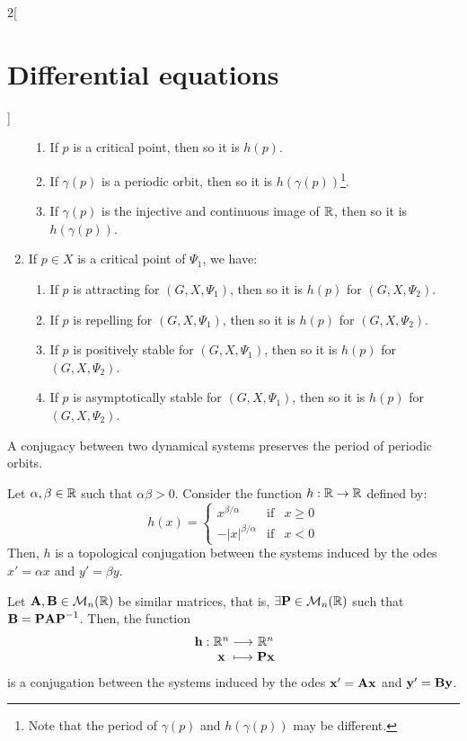 \documentclass[../../../main.tex]{subfiles}
\begin{document}
\begin{multicols}{2}[\section{Differential equations}]
\begin{prop}
\begin{enumerate}
            \begin{enumerate}
              \item If $p$ is a critical point, then so it is $h(p)$.
              \item If $\gamma(p)$ is a periodic orbit, then so it is $h(\gamma(p))$\footnote{Note that the period of $\gamma(p)$ and $h(\gamma(p))$ may be different.}.
              \item If $\gamma(p)$ is the injective and continuous image of $\mathbb{R}$, then so it is $h(\gamma(p))$.
            \end{enumerate}
      \item If $p\in X$ is a critical point of $\Psi_1$, we have:
            \begin{enumerate}
              \item If $p$ is attracting for $(G,X,\Psi_1)$, then so it is $h(p)$ for $(G,X,\Psi_2)$.
              \item If $p$ is repelling for $(G,X,\Psi_1)$, then so it is $h(p)$ for $(G,X,\Psi_2)$.
              \item If $p$ is positively stable for $(G,X,\Psi_1)$, then so it is $h(p)$ for $(G,X,\Psi_2)$.
              \item If $p$ is asymptotically stable for $(G,X,\Psi_1)$, then so it is $h(p)$ for $(G,X,\Psi_2)$.
            \end{enumerate}
    \end{enumerate}
  \end{prop}
  \begin{prop}
    A conjugacy between two dynamical systems preserves the period of periodic orbits.
  \end{prop}
  \begin{prop}
    Let $\alpha,\beta\in\mathbb{R}$ such that $\alpha\beta>0$. Consider the function $h:\mathbb{R}\rightarrow\mathbb{R}$ defined by: $$h(x)=\left\{
      \begin{array}{ccc}
        x^{\beta/\alpha}      & \text{if} & x\geq 0 \\
        -{|x|}^{\beta/\alpha} & \text{if} & x< 0
      \end{array}\right.$$
    Then, $h$ is a topological conjugation between the systems induced by the odes $x'=\alpha x$ and $y'=\beta y$.
  \end{prop}
  \begin{prop}
    Let $\boldsymbol{\mathrm{A}},\boldsymbol{\mathrm{B}}\in\mathcal{M}_n(\mathbb{R})$ be similar matrices, that is, $\exists\boldsymbol{\mathrm{P}}\in\mathcal{M}_n(\mathbb{R})$ such that $\boldsymbol{\mathrm{B}}=\boldsymbol{\mathrm{P}}\boldsymbol{\mathrm{A}}\boldsymbol{\mathrm{P}}^{-1}$. Then, the function $$\function{\vf{h}}{\RR^n}{\RR^n}{\vf{x}}{\vf{Px}}$$ is a conjugation between the systems induced by the odes $\boldsymbol{\mathrm{x}}'=\boldsymbol{\mathrm{A}}\boldsymbol{\mathrm{x}}$ and $\boldsymbol{\mathrm{y}}'=\boldsymbol{\mathrm{B}}\boldsymbol{\mathrm{y}}$.
  \end{prop}

\end{multicols}
\end{document}
